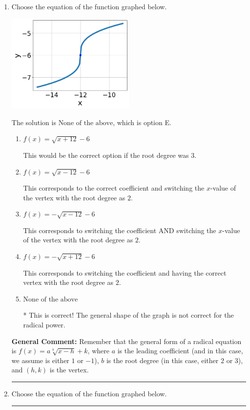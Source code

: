 \documentclass{extbook}[14pt]
\newcommand{\litem}[1]{\item #1

\rule{\textwidth}{0.4pt}}
\begin{document}
\begin{enumerate}\litem{
Choose the equation of the function graphed below.

\begin{center}
    \includegraphics[width=0.5\textwidth]{../Figures/radicalGraphToEquationB.png}
\end{center}


The solution is \( \text{None of the above} \), which is option E.\begin{enumerate}[label=\Alph*.]
\item \( f(x) = \sqrt{x + 12} - 6 \)

This would be the correct option if the root degree was $3$.
\item \( f(x) = \sqrt{x - 12} - 6 \)

This corresponds to the correct coefficient and switching the $x$-value of the vertex with the root degree as $2$.
\item \( f(x) = - \sqrt{x - 12} - 6 \)

This corresponds to switching the coefficient AND switching the $x$-value of the vertex with the root degree as $2$.
\item \( f(x) = - \sqrt{x + 12} - 6 \)

This corresponds to switching the coefficient and having the correct vertex with the root degree as $2$.
\item \( \text{None of the above} \)

* This is correct! The general shape of the graph is not correct for the radical power.
\end{enumerate}

\textbf{General Comment:} Remember that the general form of a radical equation is $ f(x) = a \sqrt[b]{x - h} + k$, where $a$ is the leading coefficient (and in this case, we assume is either $1$ or $-1$), $b$ is the root degree (in this case, either $2$ or $3$), and $(h, k)$ is the vertex.
}
\litem{
Choose the equation of the function graphed below.

}
\end{enumerate}
\end{document}
